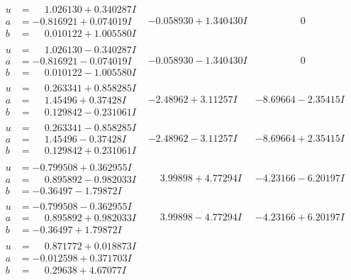 \documentclass[1p]{elsarticle_modified}
\theoremstyle{definition}
\begin{document}
$$\begin{array}{c|c|c}
\begin{aligned}
u &= \phantom{-}1.026130 + 0.340287 I \\
a &= -0.816921 + 0.074019 I \\
b &= \phantom{-}0.010122 + 1.005580 I\end{aligned}
 & -0.058930 + 1.340430 I & \phantom{-0.000000 } 0 \\ \hline\begin{aligned}
u &= \phantom{-}1.026130 - 0.340287 I \\
a &= -0.816921 - 0.074019 I \\
b &= \phantom{-}0.010122 - 1.005580 I\end{aligned}
 & -0.058930 - 1.340430 I & \phantom{-0.000000 } 0 \\ \hline\begin{aligned}
u &= \phantom{-}0.263341 + 0.858285 I \\
a &= \phantom{-}1.45496 + 0.37428 I \\
b &= \phantom{-}0.129842 - 0.231061 I\end{aligned}
 & -2.48962 + 3.11257 I & -8.69664 - 2.35415 I \\ \hline\begin{aligned}
u &= \phantom{-}0.263341 - 0.858285 I \\
a &= \phantom{-}1.45496 - 0.37428 I \\
b &= \phantom{-}0.129842 + 0.231061 I\end{aligned}
 & -2.48962 - 3.11257 I & -8.69664 + 2.35415 I \\ \hline\begin{aligned}
u &= -0.799508 + 0.362955 I \\
a &= \phantom{-}0.895892 - 0.982033 I \\
b &= -0.36497 - 1.79872 I\end{aligned}
 & \phantom{-}3.99898 + 4.77294 I & -4.23166 - 6.20197 I \\ \hline\begin{aligned}
u &= -0.799508 - 0.362955 I \\
a &= \phantom{-}0.895892 + 0.982033 I \\
b &= -0.36497 + 1.79872 I\end{aligned}
 & \phantom{-}3.99898 - 4.77294 I & -4.23166 + 6.20197 I \\ \hline\begin{aligned}
u &= \phantom{-}0.871772 + 0.018873 I \\
a &= -0.012598 + 0.371703 I \\
b &= \phantom{-}0.29638 + 4.67077 I\end{aligned}

\end{array}$$
\end{document}
